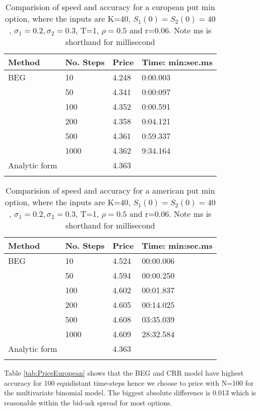 \begin{table}[th]
\caption{Comparision of speed and accuracy for a european put min option, where the inputs are K=40, $S_1(0)=S_2(0)=40$, $\sigma_1=0.2, \sigma_2=0.3$, T=1, $\rho=0.5$  and r=0.06. Note ms is shorthand for millisecond}
\label{tab:TradeOffEuroMin}
\centering
\begin{tabular}{l l l l}
\toprule
\textbf{Method} & \textbf{No. Steps} & \textbf{Price} & \textbf{Time: min:sec.ms} \\
\midrule
BEG & 10 & 4.248 & 0:00.003\\
& 50 & 4.341 & 0:00:097\\
& 100 & 4.352 & 0:00.591\\
& 200 & 4.358 & 0:04.121\\
& 500 & 4.361 & 0:59.337\\
& 1000 & 4.362 & 9:34.164\\
Analytic form & & 4.363 & \\
\bottomrule\\
\end{tabular}
\end{table}

\begin{table}[th]
\caption{Comparision of speed and accuracy for a american put min option, where the inputs are K=40, $S_1(0)=S_2(0)=40$, $\sigma_1=0.2, \sigma_2=0.3$, T=1, $\rho=0.5$  and r=0.06. Note ms is shorthand for millisecond}
\label{tab:TradeOffAmerMin}
\centering
\begin{tabular}{l l l l}
\toprule
\textbf{Method} & \textbf{No. Steps} & \textbf{Price} & \textbf{Time: min:sec.ms} \\
\midrule
BEG & 10 & 4.524 & 00:00.006\\
& 50 & 4.594 & 00:00.250\\
& 100 & 4.602 & 00:01.837\\
& 200 & 4.605 & 00:14.025\\
& 500 & 4.608 & 03:35.039\\
& 1000 & 4.609 & 28:32.584\\
Analytic form & & 4.363 & \\
\bottomrule\\
\end{tabular}
\end{table}

Table \ref{tab:PriceEuropean} shows that the BEG and CRR model have highest accuracy for 100 equidistant time-steps hence we choose to price with N=100 for the multivariate binomial model. The biggest absolute difference is 0.013 which is reasonable within the bid-ask spread for most options.

